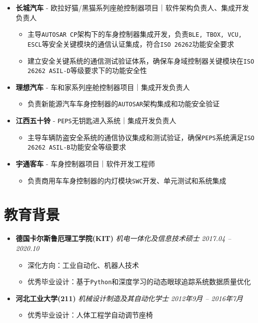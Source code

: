 \documentclass[11pt,a4paper]{ctexart}
\newcommand{\tech}[1]{\textcolor{techblue}{\texttt{#1}}}
\begin{document}
\begin{itemize}
  \item[\ding{108}] \textbf{长城汽车} - 欧拉好猫/黑猫系列座舱控制器项目｜软件架构负责人、集成开发负责人
  \begin{itemize}
    \item 主导\tech{AUTOSAR CP}架构下的车身控制器集成开发，负责\tech{BLE, TBOX, VCU, ESCL}等安全关键模块的通信认证集成，符合\tech{ISO 26262}功能安全要求
    \item 建立安全关键系统的通信测试验证体系，确保车身域控制器关键模块在\tech{ISO 26262 ASIL-D}等级要求下的功能安全性
  \end{itemize}

  \item[\ding{108}] \textbf{理想汽车} - 车和家系列座舱控制器项目｜集成开发负责人
  \begin{itemize}
    \item 负责新能源汽车车身控制器的\tech{AUTOSAR}架构集成和功能安全验证
  \end{itemize}

  \item[\ding{108}] \textbf{江西五十铃} - \tech{PEPS}无钥匙进入系统｜集成开发负责人
  \begin{itemize}
    \item 主导车辆防盗安全系统的通信协议集成和测试验证，确保\tech{PEPS}系统满足\tech{ISO 26262 ASIL-B}功能安全等级要求
  \end{itemize}

  \item[\ding{108}] \textbf{宇通客车} - 车身控制器项目｜软件开发工程师
  \begin{itemize}
    \item 负责商用车车身控制器的内灯模块\tech{SWC}开发、单元测试和系统集成
  \end{itemize}
\end{itemize}

\section*{教育背景}

\begin{itemize}
  \item \textbf{德国卡尔斯鲁厄理工学院(KIT)} \hfill
    \textit{机电一体化及信息技术硕士} \hfill
    \textit{2017.04 -- 2020.10}
  \begin{itemize}
    \item 深化方向：工业自动化、机器人技术
    \item 优秀毕业设计：基于\tech{Python}和深度学习的动态眼球追踪系统数据质量优化
  \end{itemize}

  \item \textbf{河北工业大学(211)} \hfill
    \textit{机械设计制造及其自动化学士} \hfill
    \textit{2012年9月 -- 2016年7月}
  \begin{itemize}
    \item 优秀毕业设计：人体工程学自动调节座椅
  \end{itemize}
\end{itemize}
\end{document}
